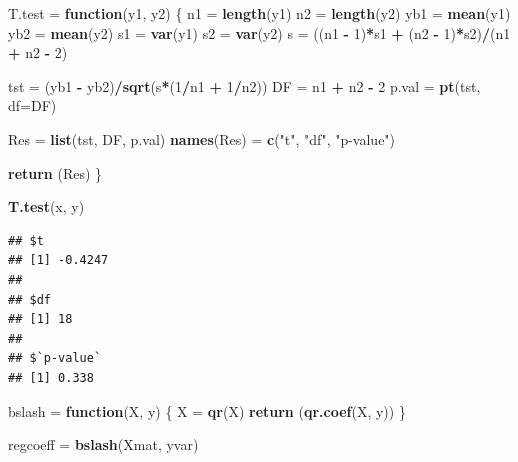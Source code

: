 \documentclass[11pt,]{krantz}
\makeatletter
\newenvironment{Shaded}{\begin{snugshade}}{\end{snugshade}}
\newcommand{\KeywordTok}[1]{\textcolor[rgb]{0.13,0.29,0.53}{\textbf{#1}}}
\newcommand{\DataTypeTok}[1]{\textcolor[rgb]{0.13,0.29,0.53}{#1}}
\newcommand{\DecValTok}[1]{\textcolor[rgb]{0.00,0.00,0.81}{#1}}
\newcommand{\StringTok}[1]{\textcolor[rgb]{0.31,0.60,0.02}{#1}}
\newcommand{\ControlFlowTok}[1]{\textcolor[rgb]{0.13,0.29,0.53}{\textbf{#1}}}
\newcommand{\OperatorTok}[1]{\textcolor[rgb]{0.81,0.36,0.00}{\textbf{#1}}}
\newcommand{\NormalTok}[1]{#1}
\newenvironment{kframe}{%
\medskip{}
\setlength{\fboxsep}{.8em}
 \def\at@end@of@kframe{}%
 \ifinner\ifhmode%
  \def\at@end@of@kframe{\end{minipage}}%
  \begin{minipage}{\columnwidth}%
 \fi\fi%
 \def\FrameCommand##1{\hskip\@totalleftmargin \hskip-\fboxsep
 \colorbox{shadecolor}{##1}\hskip-\fboxsep
     \hskip-\linewidth \hskip-\@totalleftmargin \hskip\columnwidth}%
 \MakeFramed {\advance\hsize-\width
   \@totalleftmargin\z@ \linewidth\hsize
   \@setminipage}}%
 {\par\unskip\endMakeFramed%
 \at@end@of@kframe}
\renewenvironment{Shaded}{\begin{kframe}}{\end{kframe}}
\theoremstyle{definition}
\theoremstyle{definition}
\theoremstyle{remark}
\makeatother
\begin{document}
\begin{Shaded}
\begin{Highlighting}[]
\NormalTok{T.test =}\StringTok{ }\ControlFlowTok{function}\NormalTok{(y1, y2) }
\NormalTok{\{}
\NormalTok{  n1  =}\StringTok{ }\KeywordTok{length}\NormalTok{(y1)}
\NormalTok{  n2  =}\StringTok{ }\KeywordTok{length}\NormalTok{(y2)}
\NormalTok{  yb1 =}\StringTok{ }\KeywordTok{mean}\NormalTok{(y1)}
\NormalTok{  yb2 =}\StringTok{ }\KeywordTok{mean}\NormalTok{(y2)}
\NormalTok{  s1  =}\StringTok{ }\KeywordTok{var}\NormalTok{(y1)}
\NormalTok{  s2  =}\StringTok{ }\KeywordTok{var}\NormalTok{(y2) }
\NormalTok{  s   =}\StringTok{ }\NormalTok{((n1 }\OperatorTok{-}\StringTok{ }\DecValTok{1}\NormalTok{)}\OperatorTok{*}\NormalTok{s1 }\OperatorTok{+}\StringTok{ }\NormalTok{(n2 }\OperatorTok{-}\StringTok{ }\DecValTok{1}\NormalTok{)}\OperatorTok{*}\NormalTok{s2)}\OperatorTok{/}\NormalTok{(n1 }\OperatorTok{+}\StringTok{ }\NormalTok{n2 }\OperatorTok{-}\StringTok{ }\DecValTok{2}\NormalTok{)}

\NormalTok{  tst =}\StringTok{ }\NormalTok{(yb1 }\OperatorTok{-}\StringTok{ }\NormalTok{yb2)}\OperatorTok{/}\KeywordTok{sqrt}\NormalTok{(s}\OperatorTok{*}\NormalTok{(}\DecValTok{1}\OperatorTok{/}\NormalTok{n1 }\OperatorTok{+}\StringTok{ }\DecValTok{1}\OperatorTok{/}\NormalTok{n2))}
\NormalTok{  DF =}\StringTok{ }\NormalTok{n1 }\OperatorTok{+}\StringTok{ }\NormalTok{n2 }\OperatorTok{-}\StringTok{ }\DecValTok{2}
\NormalTok{  p.val =}\StringTok{ }\KeywordTok{pt}\NormalTok{(tst, }\DataTypeTok{df=}\NormalTok{DF)}
  
\NormalTok{  Res =}\StringTok{ }\KeywordTok{list}\NormalTok{(tst, DF, p.val)}
  \KeywordTok{names}\NormalTok{(Res) =}\StringTok{ }\KeywordTok{c}\NormalTok{(}\StringTok{"t"}\NormalTok{, }\StringTok{"df"}\NormalTok{, }\StringTok{"p-value"}\NormalTok{)}
  
  \KeywordTok{return}\NormalTok{ (Res)}
\NormalTok{\}}

\KeywordTok{T.test}\NormalTok{(x, y)}
\end{Highlighting}
\end{Shaded}

\begin{verbatim}
## $t
## [1] -0.4247
## 
## $df
## [1] 18
## 
## $`p-value`
## [1] 0.338
\end{verbatim}

\begin{Shaded}
\begin{Highlighting}[]
\NormalTok{bslash =}\StringTok{ }\ControlFlowTok{function}\NormalTok{(X, y) }
\NormalTok{\{}
\NormalTok{  X =}\StringTok{ }\KeywordTok{qr}\NormalTok{(X)}
  \KeywordTok{return}\NormalTok{ (}\KeywordTok{qr.coef}\NormalTok{(X, y))}
\NormalTok{\}}

\NormalTok{regcoeff =}\StringTok{ }\KeywordTok{bslash}\NormalTok{(Xmat, yvar)}
\end{Highlighting}
\end{Shaded}
\end{document}
